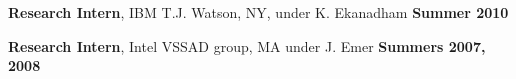 \documentclass[margin]{resume}
\begin{document}
\begin{resume}
    \vspace{-5mm}
    
    \textbf{Research Intern}, IBM T.J. Watson, NY, under K. Ekanadham \hfill \textbf{Summer 2010}\\ 

    \vspace{-5mm}

    \textbf{Research Intern}, Intel VSSAD group, MA under J. Emer \hfill \textbf{Summers 2007, 2008}\\
    \vspace{-5mm}

\end{resume}
\end{document}

